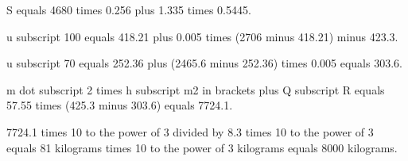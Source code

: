 S equals 4680 times 0.256 plus 1.335 times 0.5445.

u subscript 100 equals 418.21 plus 0.005 times (2706 minus 418.21) minus 423.3.

u subscript 70 equals 252.36 plus (2465.6 minus 252.36) times 0.005 equals 303.6.

m dot subscript 2 times h subscript m2 in brackets plus Q subscript R equals 57.55 times (425.3 minus 303.6) equals 7724.1.

7724.1 times 10 to the power of 3 divided by 8.3 times 10 to the power of 3 equals 81 kilograms times 10 to the power of 3 kilograms equals 8000 kilograms.